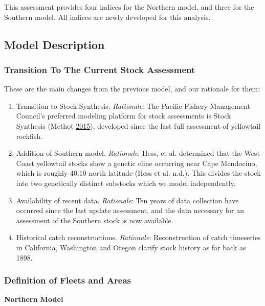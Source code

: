 \documentclass[12pt,]{article}
\begin{document}
This assessment provides four indices for the Northern model, and three
for the Southern model. All indices are newly developed for this
analysis.

\clearpage
\newpage

\subsection{Model Description}\label{model-description}

\subsubsection{Transition To The Current Stock
Assessment}\label{transition-to-the-current-stock-assessment}

These are the main changes from the previous model, and our rationale
for them:

\begin{enumerate}
\def\labelenumi{\arabic{enumi}.}
\item
  Transition to Stock Synthesis. \emph{Rationale}: The Pacific Fishery
  Management Council's preferred modeling platform for stock assessments
  is Stock Synthesis (Methot \protect\hyperlink{ref-Methot2015}{2015}),
  developed since the last full assessment of yellowtail rockfish.
\item
  Addition of Southern model. \emph{Rationale}: Hess, et al. determined
  that the West Coast yellowtail stocks show a genetic cline occurring
  near Cape Mendocino, which is roughly 40.10 north latitude (Hess et
  al. n.d.). This divides the stock into two genetically distinct
  substocks which we model independently.
\item
  Availability of recent data. \emph{Rationale}: Ten years of data
  collection have occurred since the last update assessment, and the
  data necessary for an assessment of the Southern stock is now
  available.
\item
  Historical catch reconstructions. \emph{Rationale}: Reconstruction of
  catch timeseries in California, Washington and Oregon clarify stock
  history as far back as 1898.
\end{enumerate}

\subsubsection{Definition of Fleets and
Areas}\label{definition-of-fleets-and-areas}

\textbf{Northern Model}
\end{document}
